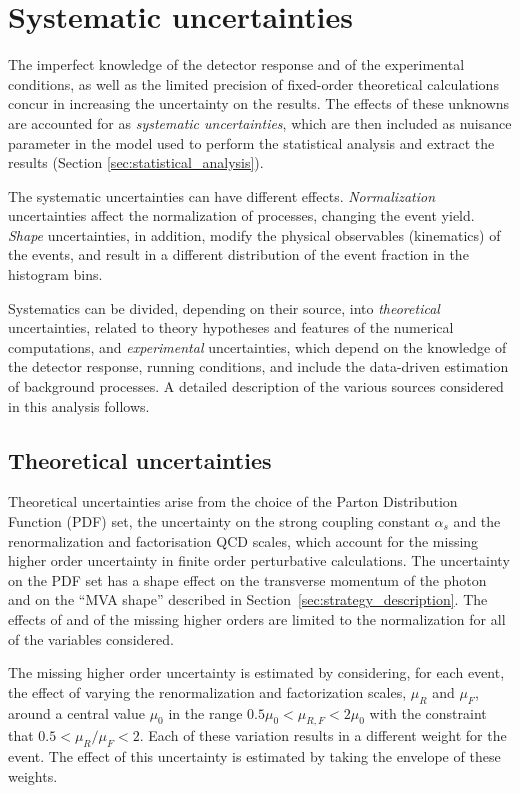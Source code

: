 \section{Systematic uncertainties}
\label{sec:systematics}
The imperfect knowledge of the detector response and of the experimental conditions, as well as the limited precision of fixed-order theoretical calculations concur in increasing the uncertainty on the results.
The effects of these unknowns are accounted for as \textit{systematic uncertainties}, which are then included as nuisance parameter in the model used to perform the statistical analysis and extract the results (Section \ref{sec:statistical_analysis}).

The systematic uncertainties can have different effects.
\textit{Normalization} uncertainties affect the normalization of processes, changing the event yield.
\textit{Shape} uncertainties, in addition, modify the physical observables (\eg kinematics) of the events, and result in a different distribution of the event fraction in the histogram bins.

Systematics can be divided, depending on their source, into \textit{theoretical} uncertainties, related to theory hypotheses and features of the numerical computations, and \textit{experimental} uncertainties, which depend on the knowledge of the detector response, running conditions, and include the data-driven estimation of background processes.
A detailed description of the various sources considered in this analysis follows.

\subsection{Theoretical uncertainties}
Theoretical uncertainties arise from the choice of the Parton Distribution Function (PDF) set,
the uncertainty on the strong coupling constant $\alpha_s$ and
the renormalization and factorisation QCD scales, which account for the missing higher order uncertainty in finite order perturbative calculations.
The uncertainty on the PDF set has a shape effect on the transverse momentum of the photon
and on the ``MVA shape'' described in Section~\ref{sec:strategy_description}.
The effects of \alpS and of the missing higher orders are limited to the normalization for all of the variables considered.

The missing higher order uncertainty is estimated by considering, for each event, the effect
of varying the renormalization and factorization scales, $\mu_R$ and $\mu_F$,
around a central value $\mu_0$ in the range $0.5\mu_0 < \mu_{R,F} < 2\mu_0$
with the constraint that $0.5 < \mu_R/\mu_F < 2$.
Each of these variation results in a different weight for the event.
The effect of this uncertainty is estimated by taking the envelope of these weights.

